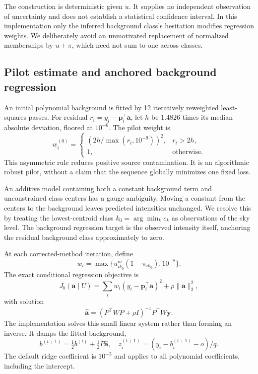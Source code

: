 \documentclass[conference]{IEEEtran}
\begin{document}
The construction is deterministic given $u$. It supplies no independent observation of uncertainty and does not establish a statistical confidence interval. In this implementation only the inferred background class's hesitation modifies regression weights. We deliberately avoid an unmotivated replacement of normalized memberships by $u+\pi$, which need not sum to one across classes.

\subsection{Pilot estimate and anchored background regression}
An initial polynomial background is fitted by 12 iteratively reweighted least-squares passes. For residual $r_i=y_i-\boldsymbol p_i^\top\boldsymbol a$, let $h$ be $1.4826$ times its median absolute deviation, floored at $10^{-6}$. The pilot weight is
\begin{equation}
 w_i^{(0)}=\begin{cases}
 (2h/\max(r_i,10^{-9}))^2,&r_i>2h,\\
 1,&\text{otherwise}.
 \end{cases}
\end{equation}
This asymmetric rule reduces positive source contamination. It is an algorithmic robust pilot, without a claim that the sequence globally minimizes one fixed loss.

An additive model containing both a constant background term and unconstrained class centers has a gauge ambiguity. Moving a constant from the centers to the background leaves predicted intensities unchanged. We resolve this by treating the lowest-centroid class $k_0=\arg\min_k c_k$ as observations of the sky level. The background regression target is the observed intensity itself, anchoring the residual background class approximately to zero.

At each corrected-method iteration, define
\begin{equation}
 w_i=\max\{u_{ik_0}^{m}(1-\pi_{ik_0}),10^{-8}\}.
\end{equation}
The exact conditional regression objective is
\begin{equation}
 J_b(\boldsymbol a\mid U)=\sum_iw_i
 (y_i-\boldsymbol p_i^\top\boldsymbol a)^2
 +\rho\|\boldsymbol a\|_2^2,\label{eq:bias}
\end{equation}
with solution
\begin{equation}
 \widehat{\boldsymbol a}=(P^\top WP+\rho I)^{-1}P^\top W\boldsymbol y.
\end{equation}
The implementation solves this small linear system rather than forming an inverse. It damps the fitted background,
\begin{equation}
 b^{(t+1)}=\tfrac12 b^{(t)}+\tfrac12P\widehat{\boldsymbol a},
 \quad z_i^{(t+1)}=(y_i-b_i^{(t+1)}-o)/q.
\end{equation}
The default ridge coefficient is $10^{-5}$ and applies to all polynomial coefficients, including the intercept.
\end{document}
